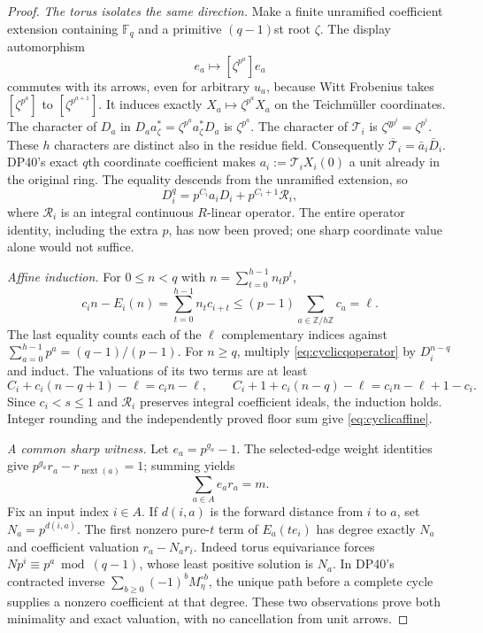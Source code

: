 \documentclass[11pt,a4paper]{article}
\theoremstyle{definition}\newtheorem{remark}[theorem]{Remark}
\newcommand{\Z}{\mathbb Z}\newcommand{\Q}{\mathbb Q}\newcommand{\F}{\mathbb F}
\newcommand{\mathscr}[1]{\mathcal{#1}}
\begin{document}
\begin{proof}
\emph{The torus isolates the same direction.}
Make a finite unramified coefficient extension containing $\F_q$ and a primitive $(q-1)$st root $\zeta$. The display automorphism
\[
 e_a\longmapsto[\zeta^{p^a}]e_a
\]
commutes with its arrows, even for arbitrary $u_a$, because Witt Frobenius takes $[\zeta^{p^a}]$ to $[\zeta^{p^{a+1}}]$. It induces exactly $X_a\mapsto\zeta^{p^a}X_a$ on the Teichm\"uller coordinates.
The character of $D_a$ in
$D_aa_\zeta^*=\zeta^{p^a}a_\zeta^*D_a$ is $\zeta^{p^a}$.
The character of $\mathscr T_i$ is $\zeta^{qp^i}=\zeta^{p^i}$.
These $h$ characters are distinct also in the residue field. Consequently
$\overline{\mathscr T}_i=\bar a_i\bar D_i$.
DP40's exact $q$th coordinate coefficient makes
$a_i:=\mathscr T_iX_i(0)$ a unit already in the original ring.
The equality descends from the unramified extension, so
\begin{equation}\label{eq:cyclicqoperator}
 D_i^q=p^{C_i}a_iD_i+p^{C_i+1}\mathscr R_i,
\end{equation}
where $\mathscr R_i$ is an integral continuous $R$-linear operator. The entire operator identity, including the extra $p$, has now been proved; one sharp coordinate value alone would not suffice.

\emph{Affine induction.}
For $0\le n<q$ with $n=\sum_{t=0}^{h-1}n_tp^t$,
\[
 c_in-E_i(n)=\sum_{t=0}^{h-1}n_tc_{i+t}
       \le(p-1)\sum_{a\in\Z/h\Z}c_a=\ell.
\]
The last equality counts each of the $\ell$ complementary indices against
$\sum_{a=0}^{h-1}p^a=(q-1)/(p-1)$.
For $n\ge q$, multiply \eqref{eq:cyclicqoperator} by $D_i^{n-q}$ and induct. The valuations of its two terms are at least
\[
 C_i+c_i(n-q+1)-\ell=c_in-\ell,\qquad
 C_i+1+c_i(n-q)-\ell=c_in-\ell+1-c_i.
\]
Since $c_i<s\le1$ and $\mathscr R_i$ preserves integral coefficient ideals, the induction holds. Integer rounding and the independently proved floor sum give \eqref{eq:cyclicaffine}.

\emph{A common sharp witness.}
Let $e_a=p^{g_a}-1$. The selected-edge weight identities give
$p^{g_a}r_a-r_{\operatorname{next}(a)}=1$; summing yields
\[
 \sum_{a\in A}e_ar_a=m.
\]
Fix an input index $i\in A$. If $d(i,a)$ is the forward distance from $i$ to $a$, set $N_a=p^{d(i,a)}$.
The first nonzero pure-$t$ term of $E_a(te_i)$ has degree exactly $N_a$ and coefficient valuation $r_a-N_ar_i$.
Indeed torus equivariance forces $Np^i\equiv p^a\bmod(q-1)$, whose least positive solution is $N_a$.
In DP40's contracted inverse $\sum_{b\ge0}(-1)^bM_\eta^{\circ b}$, the unique path before a complete cycle supplies a nonzero coefficient at that degree.
These two observations prove both minimality and exact valuation, with no cancellation from unit arrows.


\end{proof}
\end{document}
